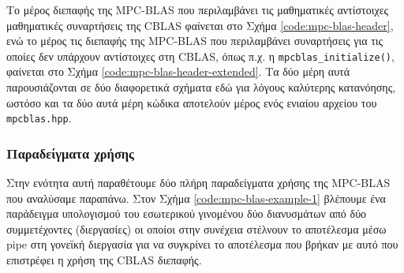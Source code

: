 Το μέρος διεπαφής της MPC-BLAS που περιλαμβάνει τις μαθηματικές αντίστοιχες μαθηματικές συναρτήσεις της CBLAS φαίνεται στο Σχήμα \ref{code:mpc-blas-header}, ενώ το μέρος τις διεπαφής της MPC-BLAS που περιλαμβάνει συναρτήσεις για τις οποίες δεν υπάρχουν αντίστοιχες στη CBLAS, όπως π.χ. η \texttt{mpcblas_initialize()}, φαίνεται στο Σχήμα \ref{code:mpc-blas-header-extended}. Τα δύο μέρη αυτά παρουσιάζονται σε δύο διαφορετικά σχήματα εδώ για λόγους καλύτερης κατανόησης, ωστόσο και τα δύο αυτά μέρη κώδικα αποτελούν μέρος ενός ενιαίου αρχείου του \texttt{mpcblas.hpp}.



\subsubsection{Παραδείγματα χρήσης}

Στην ενότητα αυτή παραθέτουμε δύο πλήρη παραδείγματα χρήσης της MPC-BLAS που αναλύσαμε παραπάνω. Στον Σχήμα \ref{code:mpc-blas-example-1} βλέπουμε ένα παράδειγμα υπολογισμού του εσωτερικού γινομένου δύο διανυσμάτων από δύο συμμετέχοντες (διεργασίες) οι οποίοι στην συνέχεια στέλνουν το αποτέλεσμα μέσω pipe στη γονεϊκή διεργασία για να συγκρίνει το αποτέλεσμα που βρήκαν με αυτό που επιστρέφει η χρήση της CBLAS διεπαφής.


